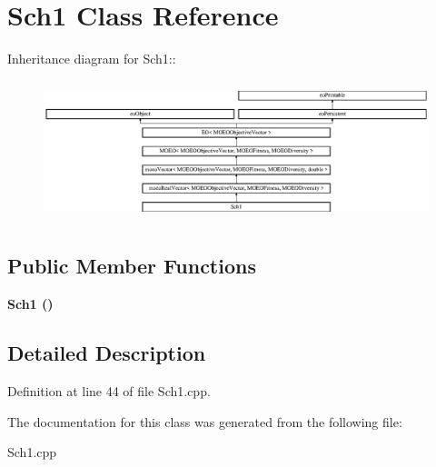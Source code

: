 \section{Sch1 Class Reference}
\label{classSch1}
Inheritance diagram for Sch1::\begin{figure}[H]
\begin{center}
\leavevmode
\includegraphics[height=4.11765cm]{classSch1}
\end{center}
\end{figure}
\subsection*{Public Member Functions}
\begin{CompactItemize}
\item 
\bf{Sch1} ()\label{classSch1_3ddc72f40539bfe0d5bb8d977b6655c0}

\end{CompactItemize}


\subsection{Detailed Description}




Definition at line 44 of file Sch1.cpp.

The documentation for this class was generated from the following file:\begin{CompactItemize}
\item 
Sch1.cpp\end{CompactItemize}
